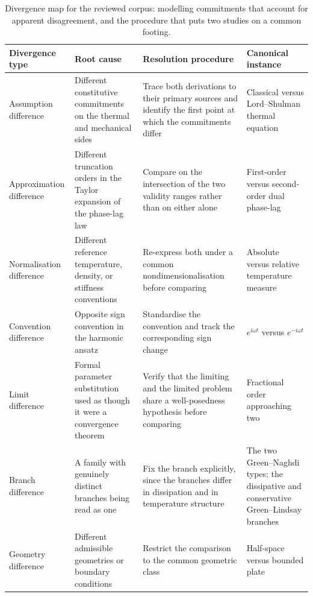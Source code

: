 \begin{table}[htbp]
\centering
\small
\caption{Divergence map for the reviewed corpus: modelling commitments that account for apparent disagreement, and the procedure that puts two studies on a common footing.}
\label{tab:divergence_map}
\begin{tabularx}{\textwidth}{@{}>{\raggedright\arraybackslash}p{2.3cm}X X>{\raggedright\arraybackslash}p{2.5cm}@{}}
\toprule
\textbf{Divergence type} & \textbf{Root cause} & \textbf{Resolution procedure} & \textbf{Canonical instance} \\
\midrule
Assumption difference & Different constitutive commitments on the thermal and mechanical sides & Trace both derivations to their primary sources and identify the first point at which the commitments differ & Classical versus Lord--Shulman thermal equation \\
Approximation difference & Different truncation orders in the Taylor expansion of the phase-lag law & Compare on the intersection of the two validity ranges rather than on either alone & First-order versus second-order dual phase-lag \\
Normalisation difference & Different reference temperature, density, or stiffness conventions & Re-express both under a common nondimensionalisation before comparing & Absolute versus relative temperature measure \\
Convention difference & Opposite sign convention in the harmonic ansatz & Standardise the convention and track the corresponding sign change & $e^{i\omega t}$ versus $e^{-i\omega t}$ \\
Limit difference & Formal parameter substitution used as though it were a convergence theorem & Verify that the limiting and the limited problem share a well-posedness hypothesis before comparing & Fractional order approaching two \\
Branch difference & A family with genuinely distinct branches being read as one & Fix the branch explicitly, since the branches differ in dissipation and in temperature structure & The two Green--Naghdi types; the dissipative and conservative Green--Lindsay branches \\
Geometry difference & Different admissible geometries or boundary conditions & Restrict the comparison to the common geometric class & Half-space versus bounded plate \\
\bottomrule
\end{tabularx}
\end{table}

